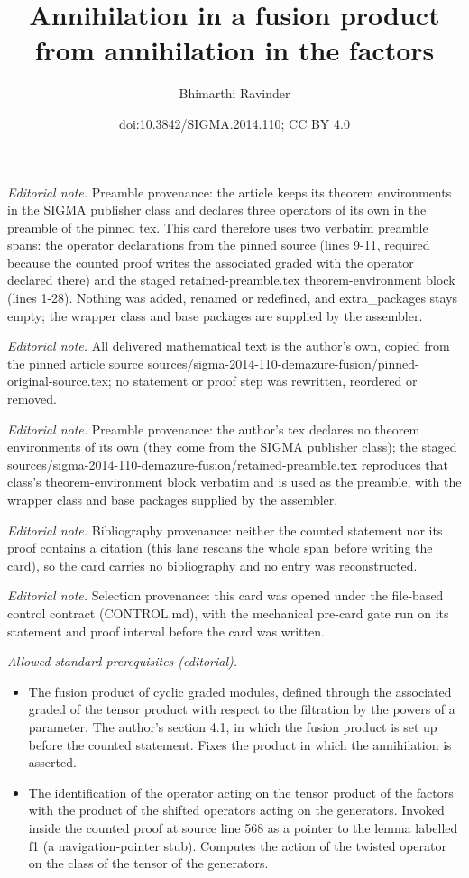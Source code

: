 \documentclass[10pt,a4paper]{amsart}
\title{Annihilation in a fusion product from annihilation in the factors}
\author{Bhimarthi Ravinder}
\date{doi:10.3842/SIGMA.2014.110; CC BY 4.0}
\begin{document}
\maketitle
\noindent\textit{Editorial note.} Preamble provenance: the article keeps its theorem environments in the SIGMA publisher class and declares three operators of its own in the preamble of the pinned tex. This card therefore uses two verbatim preamble spans: the operator declarations from the pinned source (lines 9-11, required because the counted proof writes the associated graded with the operator declared there) and the staged retained-preamble.tex theorem-environment block (lines 1-28). Nothing was added, renamed or redefined, and extra\_packages stays empty; the wrapper class and base packages are supplied by the assembler.\par\medskip
\noindent\textit{Editorial note.} All delivered mathematical text is the author's own, copied from the pinned article source sources/sigma-2014-110-demazure-fusion/pinned-original-source.tex; no statement or proof step was rewritten, reordered or removed.\par\medskip
\noindent\textit{Editorial note.} Preamble provenance: the author's tex declares no theorem environments of its own (they come from the SIGMA publisher class); the staged sources/sigma-2014-110-demazure-fusion/retained-preamble.tex reproduces that class's theorem-environment block verbatim and is used as the preamble, with the wrapper class and base packages supplied by the assembler.\par\medskip
\noindent\textit{Editorial note.} Bibliography provenance: neither the counted statement nor its proof contains a citation (this lane rescans the whole span before writing the card), so the card carries no bibliography and no entry was reconstructed.\par\medskip
\noindent\textit{Editorial note.} Selection provenance: this card was opened under the file-based control contract (CONTROL.md), with the mechanical pre-card gate run on its statement and proof interval before the card was written.\par\medskip
\noindent\textit{Allowed standard prerequisites (editorial).}\begin{itemize}
\item The fusion product of cyclic graded modules, defined through the associated graded of the tensor product with respect to the filtration by the powers of a parameter. The author's section 4.1, in which the fusion product is set up before the counted statement. Fixes the product in which the annihilation is asserted.
\item The identification of the operator acting on the tensor product of the factors with the product of the shifted operators acting on the generators. Invoked inside the counted proof at source line 568 as a pointer to the lemma labelled f1 (a navigation-pointer stub). Computes the action of the twisted operator on the class of the tensor of the generators.
\end{itemize}\medskip
\end{document}
